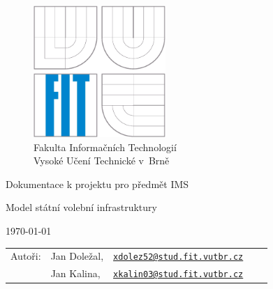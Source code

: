 \begin{titlepage}

\begin{figure}[!h]
  \centering
  \includegraphics[height=5cm]{img/logo.eps} \\
  Fakulta Informačních Technologií \\
  Vysoké Učení Technické v~Brně
\end{figure}

\vfill

\begin{center}
\begin{Large}
Dokumentace k projektu pro předmět IMS\\
\end{Large}
\bigskip
\begin{Huge}
Model státní volební infrastruktury\\
\end{Huge}
\end{center}

\vfill

\begin{center}
\begin{Large}
\today
\end{Large}
\end{center}

\vfill

\begin{flushleft}
\begin{large}
\begin{tabular}{lllll}
Autoři: & Jan Doležal,    & \href{mailto:xdolez52@stud.fit.vutbr.cz}{\nolinkurl{xdolez52@stud.fit.vutbr.cz}} & & \\
        & Jan Kalina,     & \href{mailto:xkalin03@stud.fit.vutbr.cz}{\nolinkurl{xkalin03@stud.fit.vutbr.cz}} & & \\
\end{tabular}
\end{large}
\end{flushleft}
\end{titlepage}
